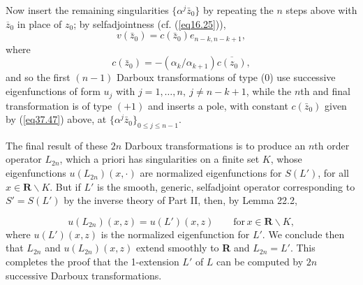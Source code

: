 \documentclass{surv-l}
\theoremstyle{plain}
\theoremstyle{definition}
\numberwithin{equation}{chapter}
\begin{document}
Now insert the remaining singularities $\{\alpha^{j}\bar{z}_{0}\}$ by repeating the $n$ steps above with $\overline{z}_{0}$ in place of $z_{0}$; by selfadjointness (cf. (\ref{eq16.25})),
\begin{equation}\label{eq37.46}
v(\bar{z}_{0})=c(\bar{z}_{0})e_{n-k,n-k+1},
\end{equation}
where
\begin{equation}\label{eq37.47}
c(\bar{z}_{0})=-(\alpha_{k}/\alpha_{k+1})\overline{c(z_{0})},
\end{equation}
and so the first $(n-1)$ Darboux transformations of type (0) use successive eigenfunctions of form $u_{j}$ with $j=1,\ldots,n,\ j\neq n-k+1$, while the $n$th and final transformation is of type $(+1)$ and inserts a pole, with constant $c(\bar{z}_{0})$ given by (\ref{eq37.47}) above, at $\{\alpha^{j}\bar{z}_{0}\}_{0\leq j\leq n-1}$.

The final result of these $2n$ Darboux transformations is to produce an $n$th order operator $L_{2n}$, which a priori has singularities on a finite set $K$, whose eigenfunctions $u(L_{2n})(x,\cdot)$ are normalized eigenfunctions for $S(L')$, for all $ x\in \textbf{R}\backslash K$. But if $L'$ is the smooth, generic, selfadjoint operator corresponding to $S'=S(L')$ by the inverse theory of Part II, then, by Lemma 22.2,

\begin{equation*}
u(L_{2n})(x,z)=u(L') (x,z) \qquad \mathrm{ for}\, x\in \textbf{R}\backslash K,
\end{equation*}
where $u(L') (x, z)$ is the normalized eigenfunction for $L'$. We conclude then that $L_{2n}$ and $u(L_{2n})(x, z)$ extend smoothly to \textbf{R} and $L_{2n}=L'$. This completes the proof that the 1-extension $L'$ of $L$ can be computed by $2n$ successive Darboux transformations.
\end{document}
